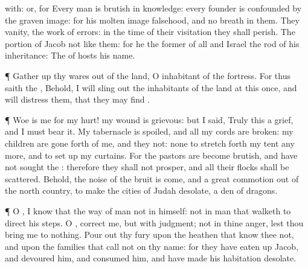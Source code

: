 {{with: or, for}
Every
man is
brutish in
{}
knowledge: every
founder is
confounded by the graven
image: for his molten
image
{}
falsehood, and
{} no
breath in them.
They
{}
vanity,
{} the
work of
errors: in the
time of their
visitation they shall
perish.
The
portion of
Jacob
{} not like them: for he
{} the
former of all
{} and
Israel
{} the
rod of his
inheritance: The
{} of
hosts
{} his
name.
\par }{\PP {}¶ Gather
up thy
wares out of the
land, O
inhabitant of the
fortress.
For thus
saith the
{}, Behold, I will
sling out the
inhabitants of the
land at this
once, and will
distress them, that they may
find
{}.
\par }{\PP {}¶
Woe is me for my
hurt! my
wound is
grievous: but I
said,
Truly this
{} a
grief, and I must
bear it.
My
tabernacle is
spoiled, and all my
cords are
broken: my
children are gone
forth of me, and they
{} not:
{} none to stretch
forth my
tent any more, and to set
up my
curtains.
For the
pastors are become
brutish, and have not
sought the
{}: therefore they shall not
prosper, and all their
flocks shall be
scattered.
Behold, the
noise of the
bruit is
come, and a
great
commotion out of the
north
country, to
make the
cities of
Judah
desolate,
{} a
den of
dragons.
\par }{\PP {}¶ O
{}, I
know that the
way of
man
{} not in himself:
{} not in
man that
walketh to
direct his
steps.
O
{},
correct me, but with
judgment; not in thine
anger, lest thou bring me to
nothing.
Pour
out thy
fury upon the
heathen that
know thee not, and upon the
families that
call not on thy
name: for they have eaten
up
Jacob, and
devoured him, and
consumed him, and have made his
habitation
desolate.

}
